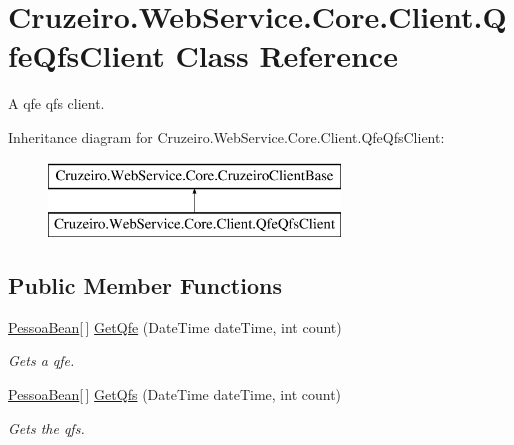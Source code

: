 \hypertarget{class_cruzeiro_1_1_web_service_1_1_core_1_1_client_1_1_qfe_qfs_client}{}\section{Cruzeiro.\+Web\+Service.\+Core.\+Client.\+Qfe\+Qfs\+Client Class Reference}
\label{class_cruzeiro_1_1_web_service_1_1_core_1_1_client_1_1_qfe_qfs_client}


A qfe qfs client.  


Inheritance diagram for Cruzeiro.\+Web\+Service.\+Core.\+Client.\+Qfe\+Qfs\+Client\+:\begin{figure}[H]
\begin{center}
\leavevmode
\includegraphics[height=2.000000cm]{class_cruzeiro_1_1_web_service_1_1_core_1_1_client_1_1_qfe_qfs_client}
\end{center}
\end{figure}
\subsection*{Public Member Functions}
\begin{DoxyCompactItemize}
\item 
\hyperlink{class_cruzeiro_1_1_core_1_1_model_1_1_beans_1_1_pessoa_bean}{Pessoa\+Bean}\mbox{[}$\,$\mbox{]} \hyperlink{class_cruzeiro_1_1_web_service_1_1_core_1_1_client_1_1_qfe_qfs_client_a1d0ffeacce2a7c896d3fabacbdb385e7}{Get\+Qfe} (Date\+Time date\+Time, int count)
\begin{DoxyCompactList}\small\item\em Gets a qfe. \end{DoxyCompactList}\item 
\hyperlink{class_cruzeiro_1_1_core_1_1_model_1_1_beans_1_1_pessoa_bean}{Pessoa\+Bean}\mbox{[}$\,$\mbox{]} \hyperlink{class_cruzeiro_1_1_web_service_1_1_core_1_1_client_1_1_qfe_qfs_client_a55646b8bb96094554e58876359dac1ad}{Get\+Qfs} (Date\+Time date\+Time, int count)
\begin{DoxyCompactList}\small\item\em Gets the qfs. \end{DoxyCompactList}\end{DoxyCompactItemize}
